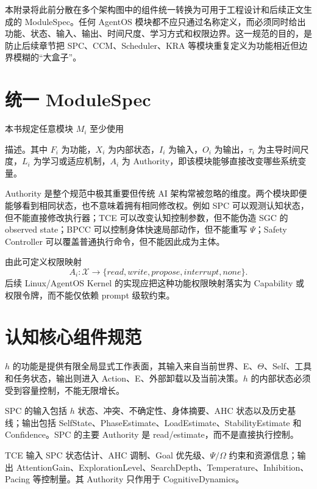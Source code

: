 \begin{chapterlead}
本附录将此前分散在多个架构图中的组件统一转换为可用于工程设计和后续正文生成的 ModuleSpec。任何 AgentOS 模块都不应只通过名称定义，而必须同时给出功能、状态、输入、输出、时间尺度、学习方式和权限边界。这一规范的目的，是防止后续章节把 SPC、CCM、Scheduler、KRA 等模块重复定义为功能相近但边界模糊的“大盒子”。
\end{chapterlead}

\section{统一 ModuleSpec}

本书规定任意模块 $M_i$ 至少使用
\begin{statementbox}
\centering
{}
\end{statementbox}
描述。其中 $F_i$ 为功能，$X_i$ 为内部状态，$I_i$ 为输入，$O_i$ 为输出，$\tau_i$ 为主导时间尺度，$L_i$ 为学习或适应机制，$A_i$ 为 Authority，即该模块能够直接改变哪些系统变量。

Authority 是整个规范中极其重要但传统 AI 架构常被忽略的维度。两个模块即便能够看到相同状态，也不意味着拥有相同修改权。例如 SPC 可以观测认知状态，但不能直接修改执行器；TCE 可以改变认知控制参数，但不能伪造 SGC 的 observed state；BPCC 可以控制身体快速局部动作，但不能重写 $\Psi$；Safety Controller 可以覆盖普通执行命令，但不能因此成为主体。

由此可定义权限映射
\[
A_i:\mathcal X\rightarrow\{read,write,propose,interrupt,none\}.
\]
后续 Linux/AgentOS Kernel 的实现应把这种功能权限映射落实为 Capability 或权限令牌，而不能仅依赖 prompt 级软约束。

\section{认知核心组件规范}

$h$ 的功能是提供有限全局显式工作表面，其输入来自当前世界、E、$\Theta$、Self、工具和任务状态，输出则进入 Action、E、外部卸载以及当前决策。$h$ 的内部状态必须受到容量控制，不能无限增长。

SPC 的输入包括 $h$ 状态、冲突、不确定性、身体摘要、AHC 状态以及历史基线；输出包括 SelfState、PhaseEstimate、LoadEstimate、StabilityEstimate 和 Confidence。SPC 的主要 Authority 是 read/estimate，而不是直接执行控制。

TCE 输入 SPC 状态估计、AHC 调制、Goal 优先级、$\Psi/\Omega$ 约束和资源信息；输出 AttentionGain、ExplorationLevel、SearchDepth、Temperature、Inhibition、Pacing 等控制量。其 Authority 只作用于 CognitiveDynamics。

